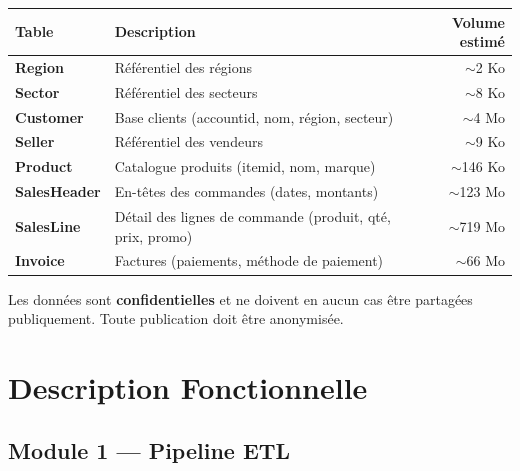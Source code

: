 \documentclass[11pt,a4paper]{article}
\begin{document}
\begin{center}
\small
\begin{tabularx}{\textwidth}{>{\bfseries}l X r}
\toprule
\rowcolor{primary}
\color{white}\bfseries Table & \color{white}\bfseries Description & \color{white}\bfseries Volume estimé \\
\midrule
Region      & Référentiel des régions                                   & $\sim$2 Ko \\
\rowcolor{lightbg}
Sector      & Référentiel des secteurs                                  & $\sim$8 Ko \\
Customer    & Base clients (accountid, nom, région, secteur)            & $\sim$4 Mo \\
\rowcolor{lightbg}
Seller      & Référentiel des vendeurs                                  & $\sim$9 Ko \\
Product     & Catalogue produits (itemid, nom, marque)                  & $\sim$146 Ko \\
\rowcolor{lightbg}
SalesHeader & En-têtes des commandes (dates, montants)                  & $\sim$123 Mo \\
SalesLine   & Détail des lignes de commande (produit, qté, prix, promo) & $\sim$719 Mo \\
\rowcolor{lightbg}
Invoice     & Factures (paiements, méthode de paiement)                 & $\sim$66 Mo \\
\bottomrule
\end{tabularx}
\end{center}

\begin{warnbox}
Les données sont \textbf{confidentielles} et ne doivent en aucun cas être partagées publiquement. Toute publication doit être anonymisée.
\end{warnbox}

\section{Description Fonctionnelle}

\subsection{Module 1 --- Pipeline ETL}
\end{document}
